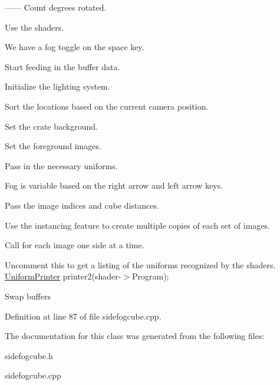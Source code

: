 ------ Count degrees rotated.

Use the shaders.

We have a fog toggle on the space key.

Start feeding in the buffer data.

Initialize the lighting system.

Sort the locations based on the current camera position.

Set the crate background.

Set the foreground images.

Pass in the necessary uniforms.

Fog is variable based on the right arrow and left arrow keys.

Pass the image indices and cube distances.

Use the instancing feature to create multiple copies of each set of images.

Call for each image one side at a time.

Uncomment this to get a listing of the uniforms recognized by the shaders. \hyperlink{classUniformPrinter}{Uniform\+Printer} printer2(shader-\/$>$Program);

Swap buffers 



Definition at line 87 of file sidefogcube.\+cpp.



The documentation for this class was generated from the following files\+:\begin{DoxyCompactItemize}
\item 
sidefogcube.\+h\item 
sidefogcube.\+cpp\end{DoxyCompactItemize}
